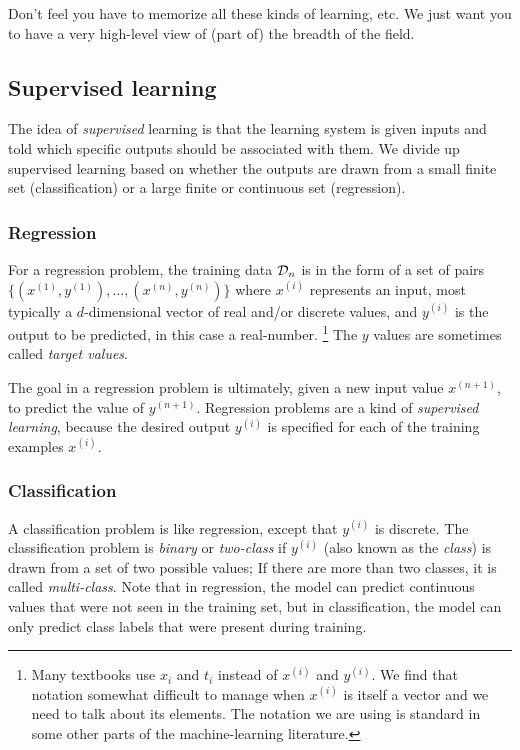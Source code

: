 \documentclass[11pt]{article}
\newcommand{\note}[1]{\todo[color=blue!10,
  linecolor=blue!90,size=\small]{\linespread{0.9}\selectfont{#1}\par}}
\renewcommand{\note}[1]{\footnote{#1}}
\newcommand\ex[2]{#1^{(#2)}}
\newcommand\dataTrain{{\cal D}_n}
\begin{document}
\begin{remark}
Don't feel you
  have to memorize all these kinds of learning, etc.  We just want you
  to have a very high-level view of (part of) the breadth of the
  field.    
\end{remark}
  


\subsection{Supervised learning}

The idea of {\em supervised} learning is that the learning system is
given inputs and told which specific outputs should be associated with
them.  We divide up supervised learning based on whether the outputs
are drawn from a small finite set (classification) or a large finite
or continuous set (regression).

\subsubsection{Regression}

For a regression problem, the training data $\dataTrain$ is in the form of a set of pairs $\{(\ex{x}{1},
\ex{y}{1}), \ldots, (\ex{x}{n}, \ex{y}{n})\}$ where $\ex{x}{i}$
represents an input, most typically a
$d$-dimensional vector of real and/or discrete values, and
$\ex{y}{i}$ is the output to be predicted, in this case a real-number.
\note{Many
  textbooks use $x_i$ and $t_i$ instead of $\ex{x}{i}$ and
  $\ex{y}{i}$.  We find that notation somewhat difficult to manage
  when $\ex{x}{i}$ is itself a vector and we need to talk about its
  elements.  The notation we are using is standard in some other parts
  of the machine-learning literature.}  The $y$ values are sometimes
called {\em target values}.

The goal in a regression problem is ultimately, given a new input 
value $\ex{x}{n+1}$, to predict the value of $\ex{y}{n+1}$.
Regression problems are a kind of {\em supervised learning},
because the desired output $\ex{y}{i}$ is specified for
each of the training examples $\ex{x}{i}$.

\subsubsection{Classification}

A classification problem is like regression, except that 
$\ex{y}{i}$ is discrete.  The classification problem is 
{\em binary} or {\em two-class} if $\ex{y}{i}$ (also known as the {\em class})
is drawn from a set of two possible values; If there are more than two classes, it is called
{\em multi-class}. Note that in regression, the model can predict continuous values that were not seen in the training set, but in classification, the model can only predict class labels that were present during training.
\end{document}

